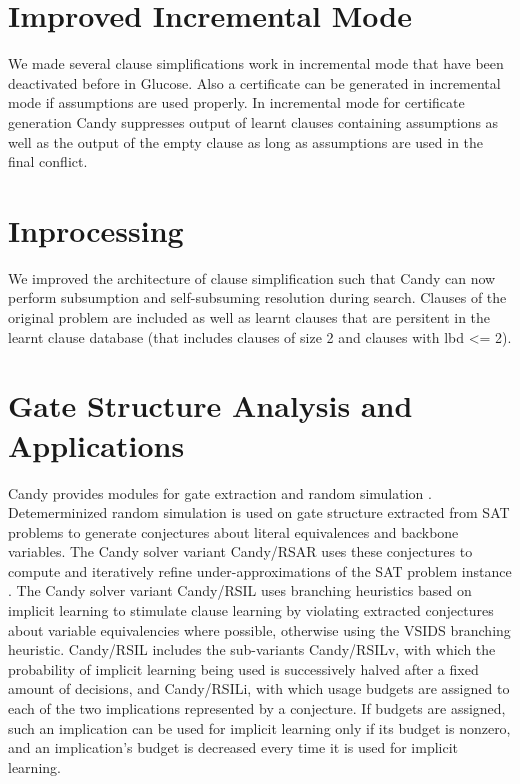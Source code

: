 \documentclass[conference]{IEEEtran}
\begin{document}
\section{Improved Incremental Mode}

We made several clause simplifications work in incremental mode that have been deactivated before in Glucose. Also a certificate can be generated in incremental mode if assumptions are used properly. In incremental mode for certificate generation Candy suppresses output of learnt clauses containing assumptions as well as the output of the empty clause as long as assumptions are used in the final conflict. 

\section{Inprocessing}

We improved the architecture of clause simplification such that Candy can now perform subsumption and self-subsuming resolution during search. Clauses of the original problem are included as well as learnt clauses that are persitent in the learnt clause database (that includes clauses of size 2 and clauses with lbd <= 2). 

\section{Gate Structure Analysis and Applications}

Candy provides modules for gate extraction \cite{Iser:2015:GateRecognition} and random simulation \cite{krohm1996use}.
Detemerminized random simulation is used on gate structure extracted from SAT problems to generate conjectures about literal equivalences and backbone variables.
The Candy solver variant Candy/RSAR uses these conjectures to compute and iteratively refine under-approximations of the SAT problem instance \cite{Kutzer:2016:Thesis}.
The Candy solver variant Candy/RSIL uses branching heuristics based on implicit learning \cite{Kutzer:2016:Thesis,DBLP:journals/jucs/LuWCMH04} to stimulate clause learning by violating extracted conjectures about variable equivalencies where possible, otherwise using the VSIDS branching heuristic.
Candy/RSIL includes the sub-variants Candy/RSILv, with which the probability of implicit learning being used is successively halved after a fixed amount of decisions, and Candy/RSILi, with which usage budgets are assigned to each of the two implications represented by a conjecture.
If budgets are assigned, such an implication can be used for implicit learning only if its budget is nonzero, and an implication's budget is decreased every time it is used for implicit learning.
\end{document}
